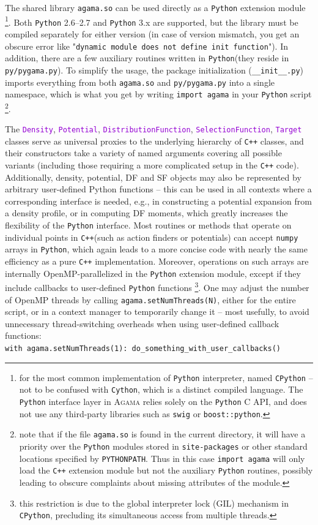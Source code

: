 \documentclass[12pt]{article}
\newcommand{\Agama}{\textsc{Agama}\xspace}
\newcommand{\Cpp}  {\texttt{C++}\xspace}
\newcommand{\Python}{\texttt{Python}\xspace}
\newcommand{\ttt}[1]{\textcolor{darkviolet}{\texttt{#1}}}
\begin{document}
The shared library \texttt{agama.so} can be used directly as a \Python extension module%
\footnote{for the most common implementation of \Python interpreter, named \texttt{CPython} -- not to be confused with \texttt{Cython}, which is a distinct compiled language. The \Python interface layer in \Agama relies solely on the \Python C API, and does not use any third-party libraries such as \texttt{swig} or \texttt{boost::python}.}. Both \Python 2.6--2.7 and \Python 3.x are supported, but the library must be compiled separately for either version (in case of version mismatch, you get an obscure error like "\texttt{dynamic module does not define init function}"). In addition, there are a few auxiliary routines written in \Python (they reside in \texttt{py/pygama.py}). To simplify the usage, the package initialization (\texttt{__init__.py}) imports everything from both \texttt{agama.so} and \texttt{py/pygama.py} into a single namespace, which is what you get by writing \texttt{import agama} in your \Python script%
\footnote{note that if the file \texttt{agama.so} is found in the current directory, it will have a priority over the \Python modules stored in \texttt{site-packages} or other standard locations specified by \texttt{PYTHONPATH}. Thus in this case \texttt{import agama} will only load the \Cpp extension module but not the auxiliary \Python routines, possibly leading to obscure complaints about missing attributes of the module.}.

The \ttt{Density}, \ttt{Potential}, \ttt{DistributionFunction}, \ttt{SelectionFunction}, \ttt{Target} classes serve as universal proxies to the underlying hierarchy of \Cpp classes, and their constructors take a variety of named arguments covering all possible variants (including those requiring a more complicated setup in the \Cpp code).
Additionally, density, potential, DF and SF objects may also be represented by arbitrary user-defined Python functions -- this can be used in all contexts where a corresponding interface is needed, e.g., in constructing a potential expansion from a density profile, or in computing DF moments, which greatly increases the flexibility of the \Python interface. Most routines or methods that operate on individual points in \Cpp (such as action finders or potentials) can accept \texttt{numpy} arrays in \Python, which again leads to a more concise code with nearly the same efficiency as a pure \Cpp implementation. Moreover, operations on such arrays are internally OpenMP-parallelized in the \Python extension module, except if they include callbacks to user-defined \Python functions%
\footnote{this restriction is due to the global interpreter lock (GIL) mechanism in \texttt{CPython}, precluding its simultaneous access from multiple threads.}. One may adjust the number of OpenMP threads by calling \texttt{agama.setNumThreads(N)}, either for the entire script, or in a context manager to temporarily change it -- most usefully, to avoid unnecessary thread-switching overheads when using user-defined callback functions:\\
\texttt{with agama.setNumThreads(1): do_something_with_user_callbacks()}
\end{document}
